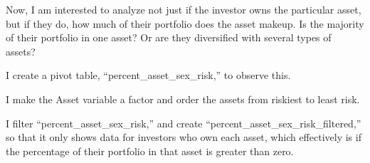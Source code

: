 \documentclass[
]{article}
\newenvironment{Shaded}{\begin{snugshade}}{\end{snugshade}}
\newcommand{\DataTypeTok}[1]{\textcolor[rgb]{0.13,0.29,0.53}{#1}}
\newcommand{\KeywordTok}[1]{\textcolor[rgb]{0.13,0.29,0.53}{\textbf{#1}}}
\newcommand{\NormalTok}[1]{#1}
\newcommand{\OperatorTok}[1]{\textcolor[rgb]{0.81,0.36,0.00}{\textbf{#1}}}
\newcommand{\OtherTok}[1]{\textcolor[rgb]{0.56,0.35,0.01}{#1}}
\newcommand{\StringTok}[1]{\textcolor[rgb]{0.31,0.60,0.02}{#1}}
\begin{document}
Now, I am interested to analyze not just if the investor owns the
particular asset, but if they do, how much of their portfolio does the
asset makeup. Is the majority of their portfolio in one asset? Or are
they diversified with several types of assets?

I create a pivot table, ``percent\_asset\_sex\_risk,'' to observe this.

\begin{Shaded}
\end{Shaded}

I make the Asset variable a factor and order the assets from riskiest to
least risk.

\begin{Shaded}
\end{Shaded}

I filter ``percent\_asset\_sex\_risk,'' and create
``percent\_asset\_sex\_risk\_filtered,'' so that it only shows data for
investors who own each asset, which effectively is if the percentage of
their portfolio in that asset is greater than zero.
\end{document}
